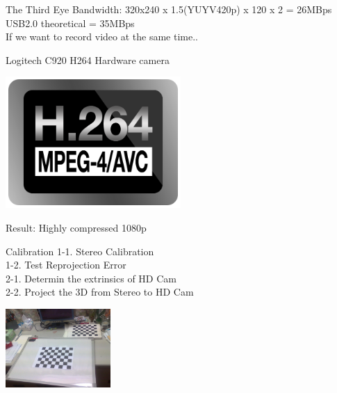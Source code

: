 \documentclass{beamer}
\begin{document}
	\begin{frame}{The Third Eye}
		Bandwidth: 320x240 x 1.5(YUYV420p) x 120 x 2 = 26MBps\\
		USB2.0 theoretical = 35MBps\\
		If we want to record video at the same time..\\
		\uncover<2->
		{
			Logitech C920 H264 Hardware camera\\
			\begin{center}
				\includegraphics[width=0.5\textwidth]{./pics/h264-logo.png} 
			\end{center}
			Result: Highly compressed 1080p
		}
	\end{frame}

	\begin{frame}{Calibration}
		1-1. Stereo Calibration\\
		1-2. Test Reprojection Error\\
		2-1. Determin the extrinsics of HD Cam\\
		2-2. Project the 3D from Stereo to HD Cam
		\begin{center}
			\includegraphics[width=0.3\textwidth]{./pics/chessboard.jpg} 
		\end{center}
	\end{frame}
\end{document}
